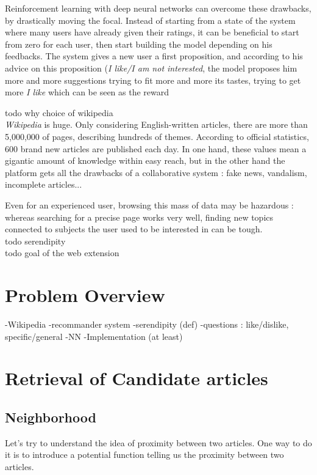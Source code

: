 \documentclass[11pt]{article}
\theoremstyle{plain}
\theoremstyle{definition}
\theoremstyle{remark}
\begin{document}
Reinforcement learning with deep neural networks can overcome these drawbacks, by drastically moving the focal. Instead of starting from a state of the system where many users have already given their ratings, it can be beneficial to start from zero for each user, then start building the model depending on his feedbacks. The system gives a new user a first proposition, and according to his advice on this proposition (\textit{I like/I am not interested}, the model proposes him more and more suggestions trying to fit more and more its tastes, trying to get more \textit{I like} which can be seen as the reward 

todo why choice of wikipedia\\

\textit{Wikipedia} is huge. Only considering English-written articles, there are more than 5,000,000 of pages, describing hundreds of themes. According to official statistics, 600 brand new articles are published each day. In one hand, these values mean a gigantic amount of knowledge within easy reach, but in the other hand the platform gets all the drawbacks of a collaborative system : fake news, vandalism, incomplete articles... 

Even for an experienced user, browsing this mass of data may be hazardous : whereas searching for a precise page works very well, finding new topics connected to subjects the user used to be interested in can be tough. \\

todo serendipity \\

todo goal of the web extension

\section{Problem Overview}
-Wikipedia
-recommander system
-serendipity (def)
-questions : like/dislike, specific/general
-NN
-Implementation
(at least)



\section{Retrieval of Candidate articles}

\subsection{Neighborhood}

Let's try to understand the idea of proximity between two articles. One way to do it is to introduce a potential function telling us the proximity between two articles.
\end{document}
